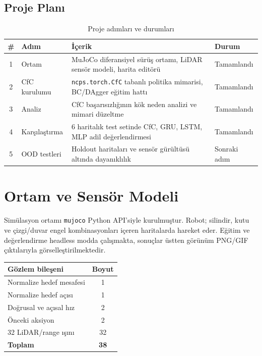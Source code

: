 \documentclass[11pt,a4paper]{article}
\newcommand{\code}[1]{\texttt{#1}}
\begin{document}
\subsection{Proje Planı}

\begin{table}[h]
\centering
\caption{Proje adımları ve durumları}
\label{tab:plan}
\begin{tabular}{clp{7.2cm}l}
\toprule
\textbf{\#} & \textbf{Adım} & \textbf{İçerik} & \textbf{Durum} \\
\midrule
1 & Ortam & MuJoCo diferansiyel sürüş ortamı, LiDAR sensör
           modeli, harita editörü & Tamamlandı \\
2 & CfC kurulumu & \code{ncps.torch.CfC} tabanlı politika mimarisi,
                  BC/DAgger eğitim hattı & Tamamlandı \\
3 & Analiz & CfC başarısızlığının kök neden analizi
             ve mimari düzeltme & Tamamlandı \\
4 & Karşılaştırma & 6 haritalık test setinde CfC, GRU,
                   LSTM, MLP adil değerlendirmesi & Tamamlandı \\
5 & OOD testleri & Holdout haritaları ve sensör gürültüsü
                  altında dayanıklılık & Sonraki adım \\
\bottomrule
\end{tabular}
\end{table}

\section{Ortam ve Sensör Modeli}

Simülasyon ortamı \code{mujoco} Python API'siyle kurulmuştur.
Robot; silindir, kutu ve çizgi/duvar engel kombinasyonları içeren
haritalarda hareket eder.
Eğitim ve değerlendirme headless modda çalışmakta, sonuçlar üstten görünüm
PNG/GIF çıktılarıyla görselleştirilmektedir.

\begin{center}
\begin{tabular}{lc}
\toprule
\textbf{Gözlem bileşeni} & \textbf{Boyut} \\
\midrule
Normalize hedef mesafesi    & 1  \\
Normalize hedef açısı       & 1  \\
Doğrusal ve açısal hız      & 2  \\
Önceki aksiyon              & 2  \\
32 LiDAR/range ışını        & 32 \\
\midrule
\textbf{Toplam}             & \textbf{38} \\
\bottomrule
\end{tabular}
\end{center}
\end{document}

